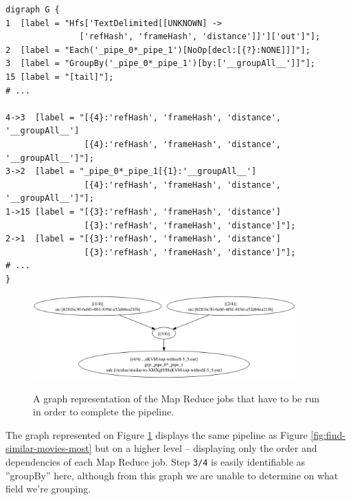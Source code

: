 \begin{lstlisting}[caption={Fragments of FindMostSimilarMoviesJob.dot}, label={lst:find-similar-movies-most-complicated-lst}]
digraph G {
1  [label = "Hfs['TextDelimited[[UNKNOWN] -> 
               ['refHash', 'frameHash', 'distance']]']['out']"];
2  [label = "Each('_pipe_0*_pipe_1')[NoOp[decl:[{?}:NONE]]]"];
3  [label = "GroupBy('_pipe_0*_pipe_1')[by:['__groupAll__']]"];
15 [label = "[tail]"];
# ...
    
4->3  [label = "[{4}:'refHash', 'frameHash', 'distance', '__groupAll__']
                [{4}:'refHash', 'frameHash', 'distance', '__groupAll__']"];
3->2  [label = "_pipe_0*_pipe_1[{1}:'__groupAll__']
                [{4}:'refHash', 'frameHash', 'distance', '__groupAll__']"];
1->15 [label = "[{3}:'refHash', 'frameHash', 'distance']
                [{3}:'refHash', 'frameHash', 'distance']"];
2->1  [label = "[{3}:'refHash', 'frameHash', 'distance']
                [{3}:'refHash', 'frameHash', 'distance']"];
# ...
}
\end{lstlisting}


\begin{figure}[ch!]
  \centering
  \includegraphics[width=0.9\textwidth]{img/FindSimilarMoviesV2Job-steps_dot.png}
  \label{fig:find-similar-movies-most-complicated-steps}
  \caption{A graph representation of the Map Reduce jobs that have to be run in order to complete the pipeline.}
\end{figure}

The graph represented on Figure \ref{fig:find-similar-movies-most-complicated-steps} displays the same pipeline as Figure \ref{fig:find-similar-movies-most} but on a higher level -- displaying only the order and dependencies of each Map Reduce job. Step \verb|3/4| is easily identifiable as ''groupBy'' here, although from this graph we are unable to determine on what field we're grouping.








